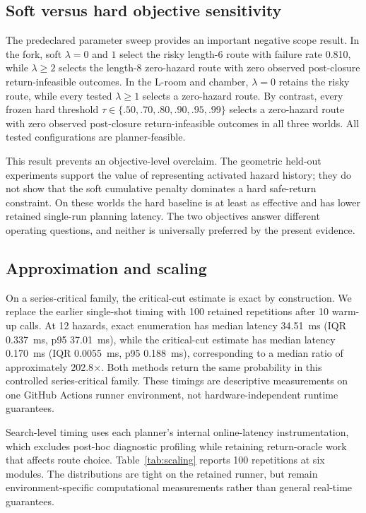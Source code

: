 \documentclass[conference]{IEEEtran}
\begin{document}
\subsection{Soft versus hard objective sensitivity}
The predeclared parameter sweep provides an important negative scope result. In the fork, soft $\lambda=0$ and $1$ select the risky length-6 route with failure rate 0.810, while $\lambda\ge2$ selects the length-8 zero-hazard route with zero observed post-closure return-infeasible outcomes. In the L-room and chamber, $\lambda=0$ retains the risky route, while every tested $\lambda\ge1$ selects a zero-hazard route. By contrast, every frozen hard threshold $\tau\in\{.50,.70,.80,.90,.95,.99\}$ selects a zero-hazard route with zero observed post-closure return-infeasible outcomes in all three worlds. All tested configurations are planner-feasible.

This result prevents an objective-level overclaim. The geometric held-out experiments support the value of representing activated hazard history; they do not show that the soft cumulative penalty dominates a hard safe-return constraint. On these worlds the hard baseline is at least as effective and has lower retained single-run planning latency. The two objectives answer different operating questions, and neither is universally preferred by the present evidence.

\subsection{Approximation and scaling}
On a series-critical family, the critical-cut estimate is exact by construction. We replace the earlier single-shot timing with 100 retained repetitions after 10 warm-up calls. At 12 hazards, exact enumeration has median latency 34.51~ms (IQR 0.337~ms, p95 37.01~ms), while the critical-cut estimate has median latency 0.170~ms (IQR 0.0055~ms, p95 0.188~ms), corresponding to a median ratio of approximately 202.8$\times$. Both methods return the same probability in this controlled series-critical family. These timings are descriptive measurements on one GitHub Actions runner environment, not hardware-independent runtime guarantees.

Search-level timing uses each planner's internal online-latency instrumentation, which excludes post-hoc diagnostic profiling while retaining return-oracle work that affects route choice. Table~\ref{tab:scaling} reports 100 repetitions at six modules. The distributions are tight on the retained runner, but remain environment-specific computational measurements rather than general real-time guarantees.
\end{document}
